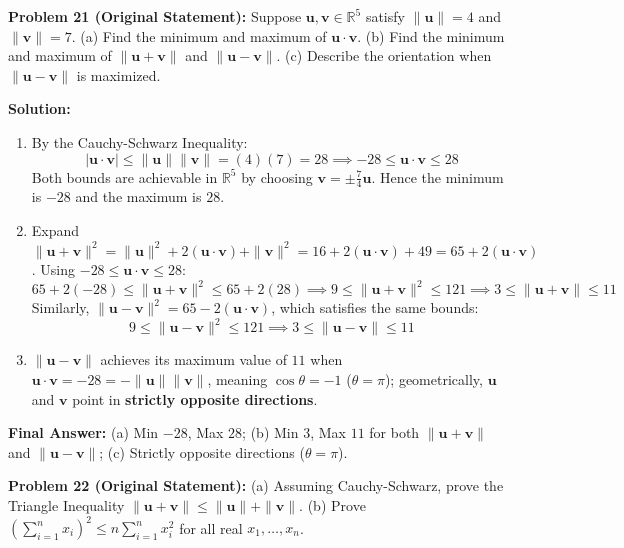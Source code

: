 \documentclass[11pt, letterpaper]{article}
\theoremstyle{definition}
\theoremstyle{remark}
\begin{document}
\medskip
\textbf{Problem 21 (Original Statement):} Suppose $\mathbf{u}, \mathbf{v} \in \mathbb{R}^5$ satisfy $\|\mathbf{u}\| = 4$ and $\|\mathbf{v}\| = 7$. (a) Find the minimum and maximum of $\mathbf{u} \cdot \mathbf{v}$. (b) Find the minimum and maximum of $\|\mathbf{u} + \mathbf{v}\|$ and $\|\mathbf{u} - \mathbf{v}\|$. (c) Describe the orientation when $\|\mathbf{u} - \mathbf{v}\|$ is maximized.

\textbf{Solution:}
\begin{enumerate}[label=(\alph*)]
    \item By the Cauchy-Schwarz Inequality:
    \[
    |\mathbf{u} \cdot \mathbf{v}| \le \|\mathbf{u}\|\|\mathbf{v}\| = (4)(7) = 28 \implies -28 \le \mathbf{u} \cdot \mathbf{v} \le 28
    \]
    Both bounds are achievable in $\mathbb{R}^5$ by choosing $\mathbf{v} = \pm \frac{7}{4}\mathbf{u}$. Hence the minimum is $-28$ and the maximum is $28$.
    \item Expand $\|\mathbf{u} + \mathbf{v}\|^2 = \|\mathbf{u}\|^2 + 2(\mathbf{u} \cdot \mathbf{v}) + \|\mathbf{v}\|^2 = 16 + 2(\mathbf{u} \cdot \mathbf{v}) + 49 = 65 + 2(\mathbf{u} \cdot \mathbf{v})$. Using $-28 \le \mathbf{u} \cdot \mathbf{v} \le 28$:
    \[
    65 + 2(-28) \le \|\mathbf{u} + \mathbf{v}\|^2 \le 65 + 2(28) \implies 9 \le \|\mathbf{u} + \mathbf{v}\|^2 \le 121 \implies 3 \le \|\mathbf{u} + \mathbf{v}\| \le 11
    \]
    Similarly, $\|\mathbf{u} - \mathbf{v}\|^2 = 65 - 2(\mathbf{u} \cdot \mathbf{v})$, which satisfies the same bounds:
    \[
    9 \le \|\mathbf{u} - \mathbf{v}\|^2 \le 121 \implies 3 \le \|\mathbf{u} - \mathbf{v}\| \le 11
    \]
    \item $\|\mathbf{u} - \mathbf{v}\|$ achieves its maximum value of $11$ when $\mathbf{u} \cdot \mathbf{v} = -28 = -\|\mathbf{u}\|\|\mathbf{v}\|$, meaning $\cos\theta = -1$ ($\theta = \pi$); geometrically, $\mathbf{u}$ and $\mathbf{v}$ point in \textbf{strictly opposite directions}.
\end{enumerate}
\textbf{Final Answer:} (a) Min $-28$, Max $28$; (b) Min $3$, Max $11$ for both $\|\mathbf{u}+\mathbf{v}\|$ and $\|\mathbf{u}-\mathbf{v}\|$; (c) Strictly opposite directions ($\theta = \pi$).

\medskip
\textbf{Problem 22 (Original Statement):} (a) Assuming Cauchy-Schwarz, prove the Triangle Inequality $\|\mathbf{u} + \mathbf{v}\| \le \|\mathbf{u}\| + \|\mathbf{v}\|$. (b) Prove $\left(\sum_{i=1}^{n} x_i\right)^2 \le n \sum_{i=1}^{n} x_i^2$ for all real $x_1, \dots, x_n$.
\end{document}
